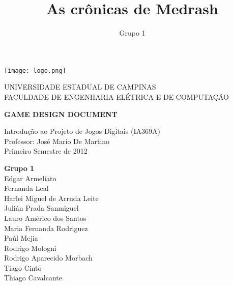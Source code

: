 \documentclass[letterpaper,11pt]{article}
\title{ As cr\^{o}nicas de Medrash }
\author{ Grupo 1 }
\date{}
\begin{document}
\begin{titlepage}
\begin{center}
\begin{minipage}{2.4 cm}
\begin{center}
\texttt{[image: logo.png]}
\end{center}
\end{minipage}
\begin{minipage}{12 cm}
\begin{center}
\Large
UNIVERSIDADE ESTADUAL DE CAMPINAS \\
FACULDADE DE ENGENHARIA ELÉTRICA E DE COMPUTAÇÃO
\end{center}
\end{minipage}
\end{center}

\vspace{5 cm}
\begin{center}
{\bf \large GAME DESIGN DOCUMENT}
\vspace{0.5 cm}

Introdução ao Projeto de Jogos Digitais (IA369A) \\
Professor: José Mario De Martino \\
Primeiro Semestre de 2012
\end{center}
\vspace{3 cm}
\begin{flushright}
{\bf Grupo 1} \\
Edgar Armeliato \\
Fernanda Leal \\
Harlei Miguel de Arruda Leite \\
Julián Prada Sanmiguel \\
Lauro Américo dos Santos \\
Maria Fernanda Rodriguez \\
Paúl Mejia \\
Rodrigo Mologni \\
Rodrigo Aparecido Morbach \\
Tiago Cinto \\
Thiago Cavalcante
\end{flushright}
\end{titlepage}
\newpage
\tableofcontents
\newpage









%



\end{document}
